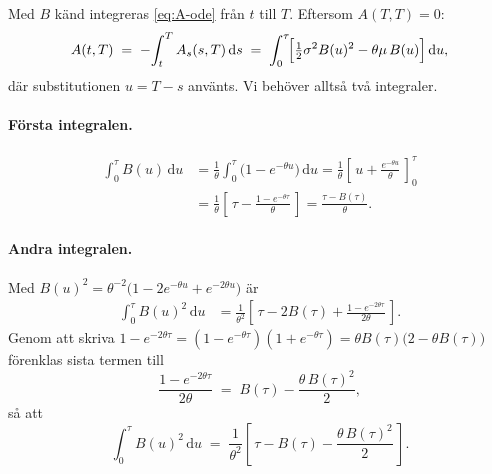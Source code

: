 \documentclass[11pt,a4paper]{article}
\newcommand{\dd}{\mathrm{d}}
\theoremstyle{plain}
\theoremstyle{definition}
\theoremstyle{remark}
\begin{document}
Med $B$ känd integreras \eqref{eq:A-ode} från $t$ till $T$. Eftersom $A(T,T)=0$:
\begin{equation}
    A(t,T) \;=\; -\!\int_t^T A_s(s,T)\,\dd s \;=\; \int_0^\tau \!\Bigl[\tfrac12\sigma^2 B(u)^2 - \theta\mu\,B(u)\Bigr]\,\dd u,
    \label{eq:A-integral}
\end{equation}
där substitutionen $u = T - s$ använts. Vi behöver alltså två integraler.

\paragraph{Första integralen.}
\begin{align}
    \int_0^\tau B(u)\,\dd u
    &= \frac{1}{\theta}\int_0^\tau \bigl(1 - e^{-\theta u}\bigr)\,\dd u
    = \frac{1}{\theta}\!\left[\,u + \frac{e^{-\theta u}}{\theta}\,\right]_0^\tau \nonumber\\
    &= \frac{1}{\theta}\!\left[\,\tau - \frac{1 - e^{-\theta\tau}}{\theta}\,\right]
    = \frac{\tau - B(\tau)}{\theta}.
    \label{eq:int-B}
\end{align}

\paragraph{Andra integralen.} Med $B(u)^2 = \theta^{-2}\bigl(1 - 2e^{-\theta u} + e^{-2\theta u}\bigr)$ är
\begin{align}
    \int_0^\tau B(u)^2\,\dd u
    &= \frac{1}{\theta^2}\!\left[\,\tau - 2B(\tau) + \frac{1 - e^{-2\theta\tau}}{2\theta}\,\right].
    \label{eq:int-B2-raw}
\end{align}
Genom att skriva $1 - e^{-2\theta\tau} = (1 - e^{-\theta\tau})(1 + e^{-\theta\tau}) = \theta B(\tau)\bigl(2 - \theta B(\tau)\bigr)$ förenklas sista termen till
\[
    \frac{1 - e^{-2\theta\tau}}{2\theta} \;=\; B(\tau) - \frac{\theta\,B(\tau)^2}{2},
\]
så att
\begin{equation}
    \int_0^\tau B(u)^2\,\dd u \;=\; \frac{1}{\theta^2}\!\left[\,\tau - B(\tau) - \frac{\theta\,B(\tau)^2}{2}\,\right].
    \label{eq:int-B2}
\end{equation}
\end{document}
